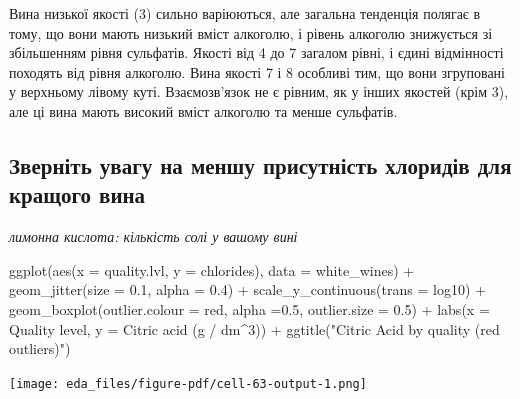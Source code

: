 \documentclass[
  letterpaper,
  DIV=11,
  numbers=noendperiod]{scrreprt}
\newenvironment{Shaded}{\begin{snugshade}}{\end{snugshade}}
\newcommand{\AttributeTok}[1]{\textcolor[rgb]{0.40,0.45,0.13}{#1}}
\newcommand{\FloatTok}[1]{\textcolor[rgb]{0.68,0.00,0.00}{#1}}
\newcommand{\FunctionTok}[1]{\textcolor[rgb]{0.28,0.35,0.67}{#1}}
\newcommand{\NormalTok}[1]{\textcolor[rgb]{0.00,0.23,0.31}{#1}}
\newcommand{\SpecialCharTok}[1]{\textcolor[rgb]{0.37,0.37,0.37}{#1}}
\newcommand{\StringTok}[1]{\textcolor[rgb]{0.13,0.47,0.30}{#1}}
\begin{document}
Вина низької якості (3) сильно варіюються, але загальна тенденція
полягає в тому, що вони мають низький вміст алкоголю, і рівень алкоголю
знижується зі збільшенням рівня сульфатів. Якості від 4 до 7 загалом
рівні, і єдині відмінності походять від рівня алкоголю. Вина якості 7 і
8 особливі тим, що вони згруповані у верхньому лівому куті.
Взаємозв'язок не є рівним, як у інших якостей (крім 3), але ці вина
мають високий вміст алкоголю та менше сульфатів.

\subsection{Зверніть увагу на меншу присутність хлоридів для кращого
вина}\label{ux437ux432ux435ux440ux43dux456ux442ux44c-ux443ux432ux430ux433ux443-ux43dux430-ux43cux435ux43dux448ux443-ux43fux440ux438ux441ux443ux442ux43dux456ux441ux442ux44c-ux445ux43bux43eux440ux438ux434ux456ux432-ux434ux43bux44f-ux43aux440ux430ux449ux43eux433ux43e-ux432ux438ux43dux430}

\emph{лимонна кислота: кількість солі у вашому вині}

\begin{Shaded}
\begin{Highlighting}[]
\FunctionTok{ggplot}\NormalTok{(}\FunctionTok{aes}\NormalTok{(}\AttributeTok{x =}\NormalTok{ quality.lvl, }\AttributeTok{y =}\NormalTok{ chlorides), }\AttributeTok{data =}\NormalTok{ white\_wines) }\SpecialCharTok{+}
  \FunctionTok{geom\_jitter}\NormalTok{(}\AttributeTok{size =} \FloatTok{0.1}\NormalTok{, }\AttributeTok{alpha =} \FloatTok{0.4}\NormalTok{) }\SpecialCharTok{+}
  \FunctionTok{scale\_y\_continuous}\NormalTok{(}\AttributeTok{trans =} \StringTok{\textquotesingle{}log10\textquotesingle{}}\NormalTok{) }\SpecialCharTok{+}
  \FunctionTok{geom\_boxplot}\NormalTok{(}\AttributeTok{outlier.colour =} \StringTok{\textquotesingle{}red\textquotesingle{}}\NormalTok{, }\AttributeTok{alpha =}\FloatTok{0.5}\NormalTok{, }\AttributeTok{outlier.size =} \FloatTok{0.5}\NormalTok{) }\SpecialCharTok{+}  
  \FunctionTok{labs}\NormalTok{(}\AttributeTok{x =} \StringTok{\textquotesingle{}Quality level\textquotesingle{}}\NormalTok{, }
       \AttributeTok{y =} \StringTok{\textquotesingle{}Citric acid (g / dm\^{}3)\textquotesingle{}}\NormalTok{) }\SpecialCharTok{+}
  \FunctionTok{ggtitle}\NormalTok{(}\StringTok{"Citric Acid by quality (red outliers)"}\NormalTok{)}
\end{Highlighting}
\end{Shaded}

\texttt{[image: eda\_files/figure-pdf/cell-63-output-1.png]}
\end{document}
